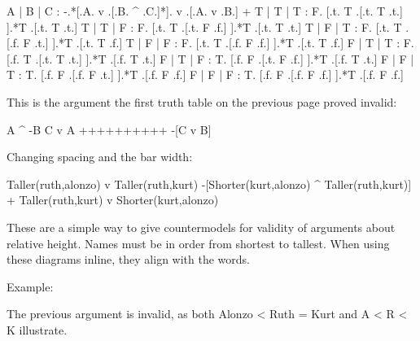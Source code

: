 \truthtable
 A | B | C : -.*[.A. v .[.B. ^ .C.]*]. v .[.A. v .B.]
+
 T | T | T : F. [.t. T .[.t. T .t.] ].*T .[.t. T .t.]
 T | T | F : F. [.t. T .[.t. F .f.] ].*T .[.t. T .t.]
 T | F | T : F. [.t. T .[.f. F .t.] ].*T .[.t. T .f.]
 T | F | F : F. [.t. T .[.f. F .f.] ].*T .[.t. T .f.]
 F | T | T : F. [.f. T .[.t. T .t.] ].*T .[.f. T .t.]
 F | T | F : T. [.f. F .[.t. F .f.] ].*T .[.f. T .t.]
 F | F | T : T. [.f. F .[.f. F .t.] ].*T .[.f. F .f.]
 F | F | F : T. [.f. F .[.f. F .f.] ].*T .[.f. F .f.]
\endtruthtable


\pagebreak


\endquantifiers
{}

This is the argument the first truth table on the previous page proved invalid:

\argument
 A ^ -B
 C v A
++++++++++
 -[C v B]
\endargument

\noindent Changing spacing and the bar width:

\argumentpadding=6pt%
\argumentsidepadding=6pt%
\argumentlinepadding=8pt%
\argumentlinethickness=2pt%

\argument
 Taller(ruth,alonzo) v Taller(ruth,kurt)
 -[Shorter(kurt,alonzo) ^ Taller(ruth,kurt)]
+
 Taller(ruth,kurt) v Shorter(kurt,alonzo)
\endargument



\unorderedlist
\li These are a simple way to give countermodels for validity of arguments about relative height.
\li Names must be in order from shortest to tallest.
\li When using these diagrams inline, they align with the words.
\endunorderedlist

\noindent Example:

\noindent The previous argument is invalid, as both
\quad
\heightmodel
 Alonzo < Ruth = Kurt
\endheightmodel
\quad and\quad
\heightmodelinitialbarheight=8pt%
\heightmodelbaradvance=4pt%
\heightmodelbarwidth=4pt%
\heightmodelspace=4pt%
\heightmodel
 A < R < K
\endheightmodel
\quad illustrate.


\bye
